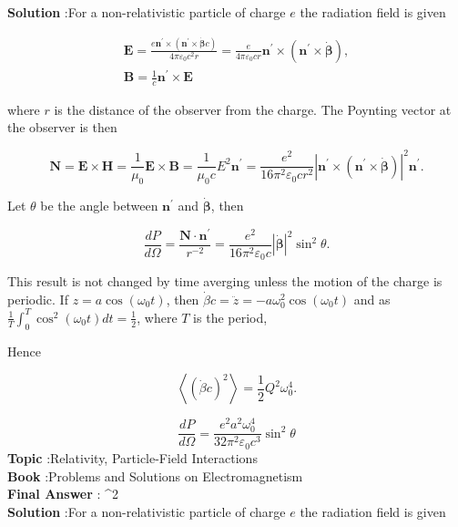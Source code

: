 \documentclass[10pt]{article}
\begin{document}
\textbf{Solution} :For a non-relativistic particle of charge $e$ the radiation field is given

$$
\begin{gathered}
\mathbf{E}=\frac{e \mathbf{n}^{\prime} \times\left(\mathbf{n}^{\prime} \times \dot{\boldsymbol{\beta}} c\right)}{4 \pi \varepsilon_{0} c^{2} r}=\frac{e}{4 \pi \varepsilon_{0} c r} \mathbf{n}^{\prime} \times\left(\mathbf{n}^{\prime} \times \dot{\boldsymbol{\beta}}\right), \\
\mathbf{B}=\frac{1}{c} \mathbf{n}^{\prime} \times \mathbf{E}
\end{gathered}
$$

where $r$ is the distance of the observer from the charge. The Poynting vector at the observer is then

$$
\mathbf{N}=\mathbf{E} \times \mathbf{H}=\frac{1}{\mu_{0}} \mathbf{E} \times \mathbf{B}=\frac{1}{\mu_{0} c} E^{2} \mathbf{n}^{\prime}=\frac{e^{2}}{16 \pi^{2} \varepsilon_{0} c r^{2}}\left|\mathbf{n}^{\prime} \times\left(\mathbf{n}^{\prime} \times \dot{\boldsymbol{\beta}}\right)\right|^{2} \mathbf{n}^{\prime} .
$$

Let $\theta$ be the angle between $\mathbf{n}^{\prime}$ and $\dot{\boldsymbol{\beta}}$, then

$$
\frac{d P}{d \Omega}=\frac{\mathbf{N} \cdot \mathbf{n}^{\prime}}{r^{-2}}=\frac{e^{2}}{16 \pi^{2} \varepsilon_{0} c}|\dot{\boldsymbol{\beta}}|^{2} \sin ^{2} \theta .
$$

This result is not changed by time averging unless the motion of the charge is periodic.
 If $z=a \cos \left(\omega_{0} t\right)$, then $\dot{\beta} c=\ddot{z}=-a \omega_{0}^{2} \cos \left(\omega_{0} t\right)$ and as $\frac{1}{T} \int_{0}^{T} \cos ^{2}\left(\omega_{0} t\right) d t=\frac{1}{2}$, where $T$ is the period,

Hence

$$
\left\langle(\dot{\beta} c)^{2}\right\rangle=\frac{1}{2} Q^{2} \omega_{0}^{4} .
$$

$$
\frac{d P}{d \Omega}=\frac{e^{2} a^{2} \omega_{0}^{4}}{32 \pi^{2} \varepsilon_{0} c^{3}} \sin ^{2} \theta
$$
\textbf{Topic} :Relativity, Particle-Field Interactions\\
\textbf{Book} :Problems and Solutions on Electromagnetism\\
\textbf{Final Answer} : \sin ^{2} \theta\\


\textbf{Solution} :For a non-relativistic particle of charge $e$ the radiation field is given
\end{document}
